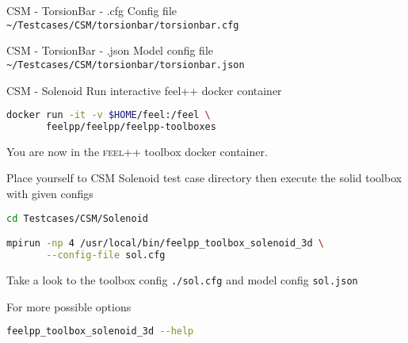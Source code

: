 \begin{frame}{CSM - TorsionBar - .cfg}
    Config file \lstinline{~/Testcases/CSM/torsionbar/torsionbar.cfg}
\vspace{5mm}
    
\end{frame}

\begin{frame}{CSM - TorsionBar - .json}
    Model config file \lstinline{~/Testcases/CSM/torsionbar/torsionbar.json}
\vspace{5mm}

\end{frame}




\begin{frame}{CSM - Solenoid}
Run  interactive feel++ docker container

\begin{lstlisting}[language=Bash,mathescape=false,emph={docker}]
docker run -it -v $HOME/feel:/feel \
       feelpp/feelpp/feelpp-toolboxes
\end{lstlisting}

You are now in the \textsc{feel++} toolbox docker container.

Place yourself to CSM Solenoid test case directory then execute the
solid toolbox with given configs

\begin{lstlisting}[language=Bash,mathescape=false, emph={feelpp_toolbox_solenoid_3d}]
cd Testcases/CSM/Solenoid

mpirun -np 4 /usr/local/bin/feelpp_toolbox_solenoid_3d \
       --config-file sol.cfg
\end{lstlisting}

Take a look to the toolbox config \lstinline{./sol.cfg} and model config
\lstinline{sol.json}

For more possible options
\begin{lstlisting}[language=Bash,mathescape=false, emph={feelpp_toolbox_solenoid_3d}]
feelpp_toolbox_solenoid_3d --help
\end{lstlisting}

\end{frame}



